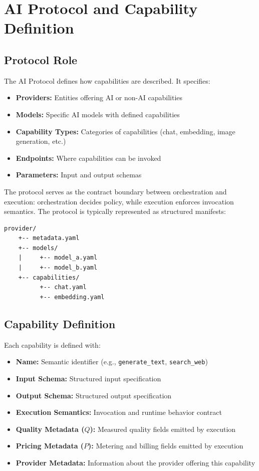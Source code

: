 \section{AI Protocol and Capability Definition}

\subsection{Protocol Role}

The AI Protocol defines how capabilities are described. It specifies:
\begin{itemize}
    \item \textbf{Providers:} Entities offering AI or non-AI capabilities
    \item \textbf{Models:} Specific AI models with defined capabilities
    \item \textbf{Capability Types:} Categories of capabilities (chat, embedding, image generation, etc.)
    \item \textbf{Endpoints:} Where capabilities can be invoked
    \item \textbf{Parameters:} Input and output schemas
\end{itemize}

The protocol serves as the contract boundary between orchestration and execution: orchestration decides policy, while execution enforces invocation semantics. The protocol is typically represented as structured manifests:

\begin{verbatim}
provider/
    +-- metadata.yaml
    +-- models/
    |     +-- model_a.yaml
    |     +-- model_b.yaml
    +-- capabilities/
          +-- chat.yaml
          +-- embedding.yaml
\end{verbatim}

\subsection{Capability Definition}

Each capability is defined with:
\begin{itemize}
    \item \textbf{Name:} Semantic identifier (e.g., \texttt{generate\_text}, \texttt{search\_web})
    \item \textbf{Input Schema:} Structured input specification
    \item \textbf{Output Schema:} Structured output specification
    \item \textbf{Execution Semantics:} Invocation and runtime behavior contract
    \item \textbf{Quality Metadata ($Q$):} Measured quality fields emitted by execution
    \item \textbf{Pricing Metadata ($P$):} Metering and billing fields emitted by execution
    \item \textbf{Provider Metadata:} Information about the provider offering this capability
\end{itemize}

